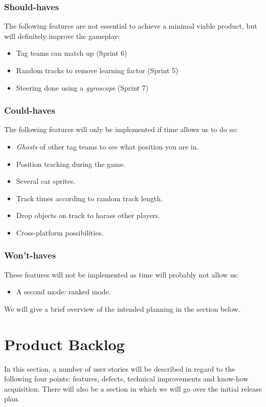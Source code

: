\documentclass[11pt,twoside,a4paper]{article}
\begin{document}
\subsubsection{Should-haves}
The following features are not essential to achieve a minimal viable product, but will definitely improve the gameplay:
\begin{itemize}
    \item Tag teams can match up (Sprint 6)  
    \item Random tracks to remove learning factor (Sprint 5)
    \item Steering done using a \emph{gyroscope} (Sprint 7)
\end{itemize}
\subsubsection{Could-haves}
The following features will only be implemented if time allows us to do so:
\begin{itemize}
    \item \emph{Ghosts} of other tag teams to see what position you are in.
    \item Position tracking during the game.
    \item Several car sprites.
    \item Track times according to random track length.
    \item Drop objects on track to harass other players.
	\item Cross-platform possibilities.
\end{itemize}
\subsubsection{Won't-haves}
These features will not be implemented as time will probably not allow us:
\begin{itemize}
    \item A second mode: ranked mode.
\end{itemize}
We will give a brief overview of the intended planning in the section below.

\section{Product Backlog}
In this section, a number of user stories will be described in regard to the following four points: features, defects, technical improvements and know-how acquisition. There will also be a section in which we will go over the initial release plan.
\end{document}
